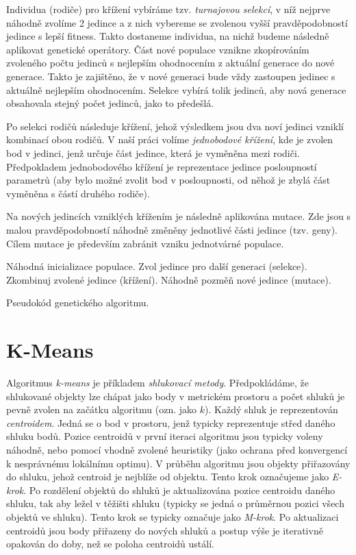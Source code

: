 Individua (rodiče) pro křížení vybíráme tzv. \emph{turnajovou selekcí}, 
v níž nejprve náhodně zvolíme 2 jedince a z 
nich vybereme se zvolenou vyšší pravděpodobností jedince s lepší fitness. 
Takto dostaneme individua, na nichž budeme následně aplikovat 
genetické operátory. Část nové populace vznikne zkopírováním zvoleného počtu 
jedinců s nejlepším ohodnocením z aktuální generace do nové generace. Takto je 
zajištěno, že v nové generaci bude vždy zastoupen jedinec s aktuálně nejlepším
ohodnocením. Selekce vybírá tolik jedinců, aby nová generace obsahovala stejný
počet jedinců, jako to předešlá.

Po selekci rodičů následuje křížení, jehož výsledkem jsou dva noví jedinci
vzniklí kombinací obou rodičů. V naší práci volíme \emph{jednobodové křížení},
kde je zvolen bod v jedinci, jenž určuje část jedince, která
je vyměněna mezi rodiči. Předpokladem jednobodového křížení je reprezentace
jedince posloupností parametrů (aby bylo možné zvolit bod v posloupnosti, od 
něhož je zbylá část vyměněna s částí druhého rodiče).

Na nových jedincích vzniklých křížením je následně aplikována mutace.
Zde jsou s malou pravděpodobností náhodně změněny jednotlivé
části jedince (tzv. geny). Cílem mutace je především zabránit vzniku 
jednotvárné populace.

\begin{algorithm}
\begin{algorithmic}
    \State Náhodná inicializace populace.
        \State Zvol jedince pro další generaci (selekce).
        \State Zkombinuj zvolené jedince (křížení).
        \State Náhodně pozměň nové jedince (mutace).
    \EndWhile

\EndFunction
\end{algorithmic}
\caption{Pseudokód genetického algoritmu.}
\label{alg:genetic_alg}
\end{algorithm}


\section{K-Means}
\label{sec:kmeans_alg}
Algoritmus \emph{k-means} je příkladem \emph{shlukovací metody}. 
Předpokládáme, že shlukované objekty lze chápat jako body v metrickém prostoru 
a počet shluků je pevně zvolen na začátku algoritmu (ozn. jako $k$). 
Každý shluk je reprezentován \emph{centroidem}.
Jedná se o bod v prostoru, jenž typicky reprezentuje střed daného shluku bodů.  
Pozice centroidů v první iteraci algoritmu jsou typicky voleny náhodně, nebo
pomocí vhodně zvolené heuristiky (jako ochrana před konvergencí k nesprávnému
lokálnímu optimu).
V průběhu algoritmu jsou objekty přiřazovány do shluku, jehož centroid
je nejblíže od objektu. Tento krok označujeme jako \emph{E-krok}. Po rozdělení 
objektů do shluků je aktualizována pozice centroidu daného shluku, 
tak aby ležel v těžišti shluku (typicky se jedná o průměrnou pozici všech 
objektů ve shluku). Tento krok se typicky označuje jako \emph{M-krok}. 
Po aktualizaci centroidů jsou body přiřazeny do nových shluků a postup výše
je iterativně opakován do doby, než se poloha centroidů ustálí.

